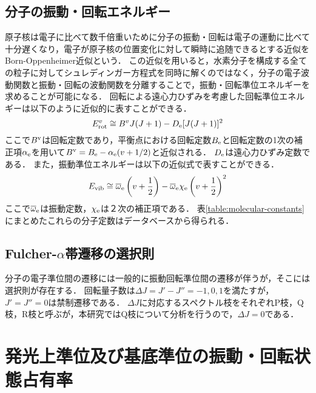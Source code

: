 \subsection{分子の振動・回転エネルギー}
原子核は電子に比べて数千倍重いために分子の振動・回転は電子の運動に比べて十分遅くなり，電子が原子核の位置変化に対して瞬時に追随できるとする近似をBorn-Oppenheimer近似という．
この近似を用いると，水素分子を構成する全ての粒子に対してシュレディンガー方程式を同時に解くのではなく，分子の電子波動関数と振動・回転の波動関数を分離することで，振動・回転準位エネルギーを求めることが可能になる．
回転による遠心力ひずみを考慮した回転準位エネルギーは以下のように近似的に表すことができる\cite{bunsibunko-no-kiso}．
\begin{equation}
    E^v_{\rm rot} \cong B^v J (J+1) - D_{\rm e} [J(J+1)]^2
\end{equation}
ここで$B^{\rm v}$は回転定数であり，平衡点における回転定数$B_{\rm e}$と回転定数の1次の補正項$\alpha_{\rm e}$を用いて$B^{\rm v}=B_{\rm e} - \alpha_{\rm e} (v + 1/2)$と近似される．
$D_{\rm e}$は遠心力ひずみ定数である．
また，振動準位エネルギーは以下の近似式で表すことができる．
\begin{equation}
    E_{\rm vib} \cong \overline{\omega}_{\rm e} \left(v + \frac{1}{2} \right) - \overline{\omega}_{\rm e} \chi_{\rm e} \left(v + \frac{1}{2} \right)^2
\end{equation}
ここで$\overline{\omega}_{\rm e}$は振動定数，$\chi_{\rm e}$は２次の補正項である．
表\ref{table:molecular-constants}にまとめたこれらの分子定数はデータベース\cite{nist}から得られる．

\subsection{Fulcher-$\alpha$帯遷移の選択則}
分子の電子準位間の遷移には一般的に振動回転準位間の遷移が伴うが，そこには選択則が存在する\cite{bunsibunko-no-kiso}．
回転量子数は$\Delta J = J' - J'' = -1,0,1$を満たすが，$J'=J''=0$は禁制遷移である．
$\Delta J$に対応するスペクトル枝をそれぞれP枝，Q枝，R枝と呼ぶが，本研究ではQ枝について分析を行うので，$\Delta J = 0$である．

\section{発光上準位及び基底準位の振動・回転状態占有率}
